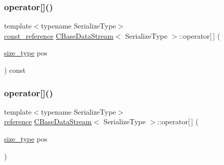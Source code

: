 \subsubsection{\texorpdfstring{operator[]()}{operator[]()}\hspace{0.1cm}{\footnotesize\ttfamily [1/2]}}
{\footnotesize\ttfamily template$<$typename Serialize\+Type$>$ \\
\mbox{\hyperlink{class_c_base_data_stream_aabfd39998036383d2ee384029f221aab}{const\+\_\+reference}} \mbox{\hyperlink{class_c_base_data_stream}{C\+Base\+Data\+Stream}}$<$ Serialize\+Type $>$\+::operator\mbox{[}$\,$\mbox{]} (\begin{DoxyParamCaption}\item[{\mbox{\hyperlink{class_c_base_data_stream_ad042ddea628c43357b9b13be89c71964}{size\+\_\+type}}}]{pos }\end{DoxyParamCaption}) const\hspace{0.3cm}{\ttfamily [inline]}}

\mbox{\label{class_c_base_data_stream_aa56015ceb6b79db5cfc08695d68310bf}} 
\subsubsection{\texorpdfstring{operator[]()}{operator[]()}\hspace{0.1cm}{\footnotesize\ttfamily [2/2]}}
{\footnotesize\ttfamily template$<$typename Serialize\+Type$>$ \\
\mbox{\hyperlink{class_c_base_data_stream_a74ec577e6f675c786880b39700b8f317}{reference}} \mbox{\hyperlink{class_c_base_data_stream}{C\+Base\+Data\+Stream}}$<$ Serialize\+Type $>$\+::operator\mbox{[}$\,$\mbox{]} (\begin{DoxyParamCaption}\item[{\mbox{\hyperlink{class_c_base_data_stream_ad042ddea628c43357b9b13be89c71964}{size\+\_\+type}}}]{pos }\end{DoxyParamCaption})\hspace{0.3cm}{\ttfamily [inline]}}

\mbox{\label{class_c_base_data_stream_a3ab78204837cf4f59a0a01bb22a6f043}} 
